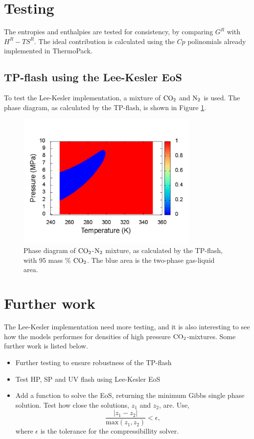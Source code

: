 \documentclass[english]{../thermomemo/thermomemo}
\numberwithin{equation}{section}
\newcommand*{\coto}{\ensuremath{\text{CO}_{\text{\scriptsize
        2}}}\xspace}
\newcommand*{\nto}{\ensuremath{\text{N}_{\text{\scriptsize
        2}}}\xspace}
\begin{document}
\section{Testing}
The entropies and enthalpies are tested for consistency, by comparing
$G^R$ with $H^R-TS^R$. The ideal contribution is calculated using the
$Cp$ polinomials already implemented in ThermoPack. 
\subsection{TP-flash using the Lee-Kesler EoS}
To test the Lee-Kesler implementation, a mixture of \coto and \nto is
used. The phase diagram, as calculated by the TP-flash, is shown in
Figure \ref{fig:co2n2}.
\begin{figure}[h]
  \centering
  \includegraphics[width=0.8\textwidth]{co2n2}
  \caption{Phase diagram of \coto-\nto mixture, as calculated by the TP-flash,
  with 95 mass \% \coto. The blue area is the two-phase gas-liquid area.}
  \label{fig:co2n2}
\end{figure}

\section{Further work}
The Lee-Kesler implementation need more testing, and it is also
interesting to see how the models performes for densities of high
pressure \coto-mixtures. Some further work is listed below.
\begin{itemize}
\item Further testing to ensure robustness of the TP-flash
\item Test HP, SP and UV flash using Lee-Kesler EoS
\item Add a function to solve the EoS, returning the minimum Gibbs
  single phase solution. Test how close the solutions, $z_1$ and
  $z_2$, are. Use,
  \begin{equation}
    \frac{|z_1-z_2|}{\text{max}(z_1,z_2)} < \epsilon,
  \end{equation}
  where $\epsilon$ is the tolerance for the compressibillity solver.
\end{itemize}
\end{document}
